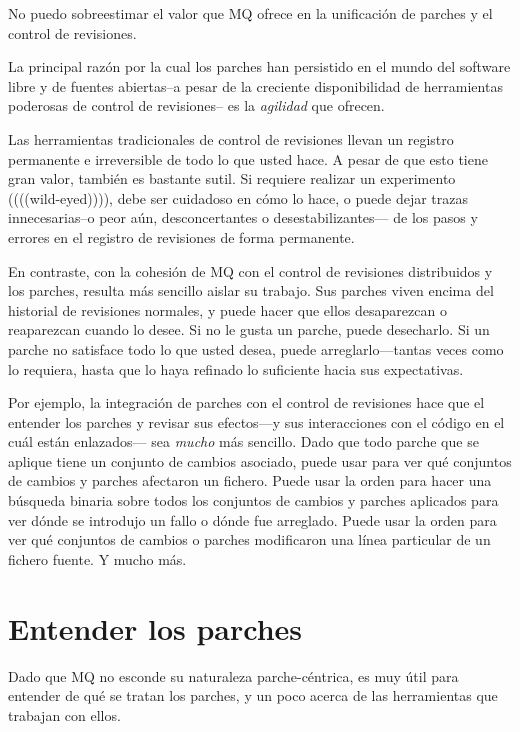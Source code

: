 No puedo sobreestimar el valor que MQ ofrece en la unificación de
parches y el control de revisiones.

La principal razón por la cual los parches han persistido en el mundo
del software libre y de fuentes abiertas--a pesar de la creciente
disponibilidad de herramientas poderosas de control de revisiones-- es
la \emph{agilidad} que ofrecen.

Las herramientas tradicionales de control de revisiones llevan un
registro permanente e irreversible de todo lo que usted hace.  A pesar
de que esto tiene gran valor, también es bastante sutil.  Si requiere
realizar un experimento ((((wild-eyed)))), debe ser cuidadoso en cómo
lo hace, o puede dejar trazas innecesarias--o peor aún,
desconcertantes o desestabilizantes--- de los pasos y errores en el
registro de revisiones de forma permanente.

En contraste, con la cohesión de MQ con el control de revisiones
distribuidos y los parches, resulta más sencillo aislar su trabajo.
Sus parches viven encima del historial de revisiones normales, y
puede hacer que ellos desaparezcan o reaparezcan cuando lo desee.  Si
no le gusta un parche, puede desecharlo.  Si un parche no satisface
todo lo que usted desea, puede arreglarlo---tantas veces como lo
requiera, hasta que lo haya refinado lo suficiente hacia sus
expectativas.

Por ejemplo, la integración de parches con el control de revisiones
hace que el entender los parches y revisar sus efectos---y sus
interacciones con el código en el cuál están enlazados--- sea
\emph{mucho} más sencillo.  Dado que todo parche que se aplique tiene
un conjunto de cambios asociado, puede usar
 para ver qué conjuntos de cambios y
parches afectaron un fichero.  Puede usar la orden  para
hacer una búsqueda binaria sobre todos los conjuntos de cambios y
parches aplicados para ver dónde se introdujo un fallo o dónde fue
arreglado.  Puede usar la orden  para ver qué
conjuntos de cambios o parches modificaron una línea particular de un
fichero fuente. Y mucho más.

\section{Entender los parches}
\label{sec:mq:patch}

Dado que MQ no esconde su naturaleza parche-céntrica, es muy útil para
entender de qué se tratan los parches, y un poco acerca de las
herramientas que trabajan con ellos.

